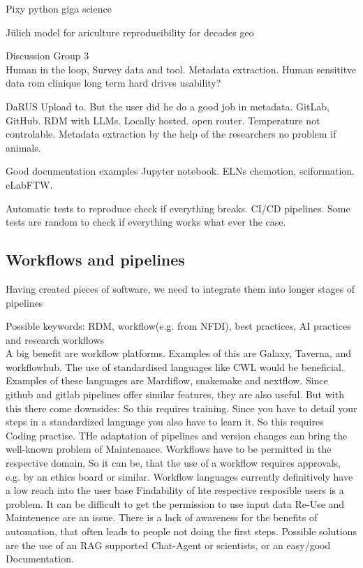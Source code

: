 \documentclass{eceasst}
\begin{document}
Pixy python giga science

Jülich model for ariculture reproducibility for decades geo


Discussion Group 3\\

Human in the loop, Survey data and tool. Metadata extraction.
Human sensititve data rom clinique long term hard drives usability?

DaRUS Upload to. But the user did he do a good job in metadata.
GitLab, GitHub. RDM with LLMs. Locally hosted. open router. Temperature not controlable. Metadata extraction by the help of the researchers no problem if animals.

Good documentation examples Jupyter notebook. ELNs chemotion, sciformation.
eLabFTW.

Automatic tests to reproduce check if everything breaks. CI/CD pipelines. Some tests are random to check if everything works what ever the case.


\subsection{Workflows and pipelines}
Having created pieces of software, we need to integrate them into longer stages of pipelines

Possible keywords: RDM, workflow(e.g. from NFDI), best practices, AI practices and research workflows\\

A big benefit are workflow platforms. Examples of this are Galaxy, Taverna, and workflowhub. The use of standardised languages like CWL would be beneficial.
Examples of these languages are Mardiflow, snakemake and nextflow. Since github and gitlab pipelines offer similar features, they are also useful.
But with this there come downsides:
So this requires training. Since you have to detail your steps in a standardized language you also have to learn it. So this requires Coding practise.
THe adaptation of pipelines and version changes can bring the well-known problem of Maintenance.
Workflows have to be permitted in the respective domain, So it can be, that the use of a workflow requires approvals, e.g. by an ethics board or similar.
Workflow languages currently definitively have a low reach into the user base
Findability of hte respective resposible users is a problem.
It can be difficult to get the permission to use input data
Re-Use and Maintenence are an issue.
There is a lack of awareness for the benefits of automation, that often leads to people not doing the first steps.
Possible solutions are the use of an RAG supported Chat-Agent or scientists, or an easy/good Documentation.
\end{document}
